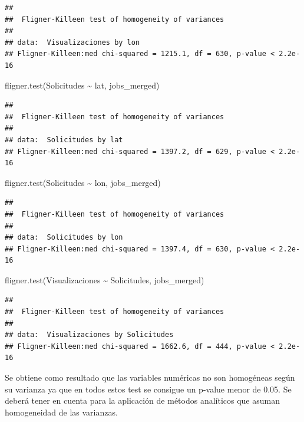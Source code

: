 \documentclass[
]{article}
\newenvironment{Shaded}{\begin{snugshade}}{\end{snugshade}}
\newcommand{\KeywordTok}[1]{\textcolor[rgb]{0.94,0.87,0.69}{#1}}
\newcommand{\NormalTok}[1]{\textcolor[rgb]{0.80,0.80,0.80}{#1}}
\newcommand{\OperatorTok}[1]{\textcolor[rgb]{0.94,0.94,0.82}{#1}}
\newcommand{\StringTok}[1]{\textcolor[rgb]{0.80,0.58,0.58}{#1}}
\begin{document}
\begin{verbatim}
## 
##  Fligner-Killeen test of homogeneity of variances
## 
## data:  Visualizaciones by lon
## Fligner-Killeen:med chi-squared = 1215.1, df = 630, p-value < 2.2e-16
\end{verbatim}

\begin{Shaded}
\begin{Highlighting}[]
\KeywordTok{fligner.test}\NormalTok{(Solicitudes }\OperatorTok{\textasciitilde{}}\StringTok{ }\NormalTok{lat, jobs\_merged)}
\end{Highlighting}
\end{Shaded}

\begin{verbatim}
## 
##  Fligner-Killeen test of homogeneity of variances
## 
## data:  Solicitudes by lat
## Fligner-Killeen:med chi-squared = 1397.2, df = 629, p-value < 2.2e-16
\end{verbatim}

\begin{Shaded}
\begin{Highlighting}[]
\KeywordTok{fligner.test}\NormalTok{(Solicitudes }\OperatorTok{\textasciitilde{}}\StringTok{ }\NormalTok{lon, jobs\_merged)}
\end{Highlighting}
\end{Shaded}

\begin{verbatim}
## 
##  Fligner-Killeen test of homogeneity of variances
## 
## data:  Solicitudes by lon
## Fligner-Killeen:med chi-squared = 1397.4, df = 630, p-value < 2.2e-16
\end{verbatim}

\begin{Shaded}
\begin{Highlighting}[]
\KeywordTok{fligner.test}\NormalTok{(Visualizaciones }\OperatorTok{\textasciitilde{}}\StringTok{ }\NormalTok{Solicitudes, jobs\_merged)}
\end{Highlighting}
\end{Shaded}

\begin{verbatim}
## 
##  Fligner-Killeen test of homogeneity of variances
## 
## data:  Visualizaciones by Solicitudes
## Fligner-Killeen:med chi-squared = 1662.6, df = 444, p-value < 2.2e-16
\end{verbatim}

Se obtiene como resultado que las variables numéricas no son homogéneas
según su varianza ya que en todos estos test se consigue un p-value
menor de 0.05. Se deberá tener en cuenta para la aplicación de métodos
analíticos que asuman homogeneidad de las varianzas.
\end{document}
